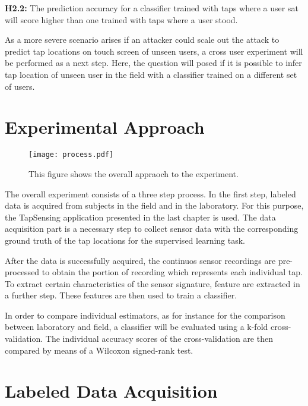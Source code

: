 \begin{center}
  \begin{framed}
    \textbf{H2.2:} The prediction accuracy for a classifier trained with taps where a user sat will score higher than one trained with taps where a user stood.
  \end{framed}
\end{center}

As a more severe scenario arises if an attacker could scale out the attack to predict tap locations on touch screen of unseen users, a cross user experiment will be performed as a next step. Here, the question will posed if it is possible to infer tap location of unseen user in the field with a classifier trained on a different set of users.

\section{Experimental Approach}

\begin{figure}[h!]
  \centering
  \texttt{[image: process.pdf]}
  \caption{This figure shows the overall appraoch to the experiment.} \label{fig:appraoch}
\end{figure}

The overall experiment consists of a three step process. In the first step, labeled data is acquired from subjects in the field and in the laboratory. For this purpose, the TapSensing application presented in the last chapter is used. The data acquisition part is a necessary step to collect sensor data with the corresponding ground truth of the tap locations for the supervised learning task. 

After the data is successfully acquired, the continuos sensor recordings are pre-processed to obtain the portion of recording which represents each individual tap. To extract certain characteristics of the sensor signature, feature are extracted in a further step. These features are then used to train a classifier.

In order to compare individual estimators, as for instance for the comparison between laboratory and field, a classifier will be evaluated using a k-fold cross-validation. The individual accuracy scores of the cross-validation are then compared by means of a Wilcoxon signed-rank test.

\section{Labeled Data Acquisition}

